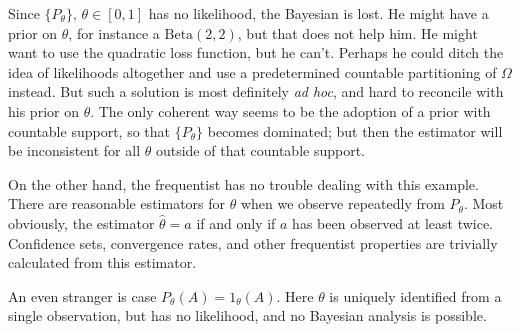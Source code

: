 Since $\{P_{\theta}\},\,\theta\in[0,1]$ has no likelihood, the Bayesian
is lost. He might have a prior on $\theta$, for instance a $\textrm{Beta}(2,2)$,
but that does not help him. He might want to use the quadratic loss
function, but he can't. Perhaps he could ditch the idea of likelihoods
altogether and use a predetermined countable partitioning of $\Omega$
instead. But such a solution is most definitely \emph{ad hoc}, and
hard to reconcile with his prior on $\theta$. The only coherent way
seems to be the adoption of a prior with countable support, so that
$\{P_{\theta}\}$ becomes dominated; but then the estimator will be
inconsistent for all $\theta$ outside of that countable support.

On the other hand, the frequentist has no trouble dealing with this
example. There are reasonable estimators for $\theta$ when we observe
repeatedly from $P_{\theta}$. Most obviously, the estimator $\hat{\theta}=a$
if and only if $a$ has been observed at least twice. Confidence sets,
convergence rates, and other frequentist properties are trivially
calculated from this estimator.

An even stranger is case $P_{\theta}(A)=1_{\theta}(A)$. Here $\theta$
is uniquely identified from a single observation, but has no likelihood,
and no Bayesian analysis is possible.


